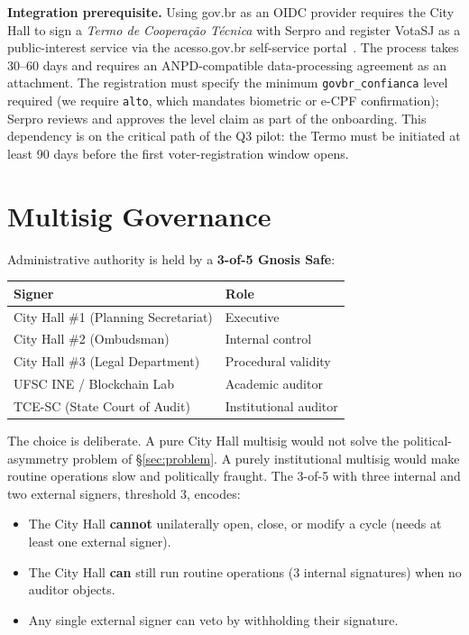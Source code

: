 \documentclass[12pt]{article}
\begin{document}
\textbf{Integration prerequisite.} Using gov.br as an OIDC provider requires
the City Hall to sign a \emph{Termo de Coopera\c{c}\~ao T\'ecnica} with Serpro
and register VotaSJ as a public-interest service via the acesso.gov.br
self-service portal~\cite{govbrmanual}. The process takes 30--60 days and
requires an ANPD-compatible data-processing agreement as an attachment. The
registration must specify the minimum \texttt{govbr\_confianca} level
required (we require \texttt{alto}, which mandates biometric or e-CPF
confirmation); Serpro reviews and approves the level claim as part of the
onboarding. This dependency is on the critical path of the Q3 pilot: the
Termo must be initiated at least 90 days before the first voter-registration
window opens.

\section{Multisig Governance}
\label{sec:governance}

Administrative authority is held by a \textbf{3-of-5 Gnosis Safe}:

\begin{center}
\begin{tabular}{l l}
\toprule
\textbf{Signer} & \textbf{Role} \\
\midrule
City Hall \#1 (Planning Secretariat) & Executive \\
City Hall \#2 (Ombudsman)            & Internal control \\
City Hall \#3 (Legal Department)     & Procedural validity \\
UFSC INE / Blockchain Lab           & Academic auditor \\
TCE-SC (State Court of Audit)        & Institutional auditor \\
\bottomrule
\end{tabular}
\end{center}

The choice is deliberate. A pure City Hall multisig would not solve the
political-asymmetry problem of §\ref{sec:problem}. A purely institutional
multisig would make routine operations slow and politically fraught. The
3-of-5 with three internal and two external signers, threshold 3, encodes:

\begin{itemize}
  \item The City Hall \textbf{cannot} unilaterally open, close, or modify a
        cycle (needs at least one external signer).
  \item The City Hall \textbf{can} still run routine operations (3 internal
        signatures) when no auditor objects.
  \item Any single external signer can veto by withholding their signature.
\end{itemize}
\end{document}
